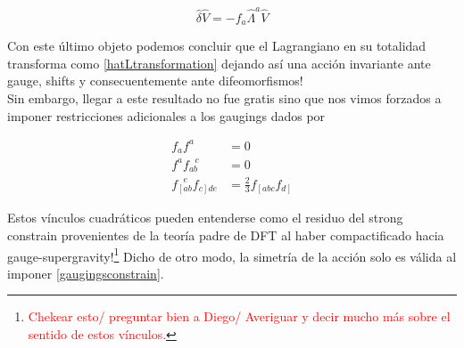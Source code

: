 \documentclass{article}
\numberwithin{equation}{section}
\begin{document}
\begin{equation}
\hat{\delta} \hat{V} = - f_a \hat{\Lambda}^a \hat{V}
\end{equation}

Con este último objeto podemos concluir que el Lagrangiano en su totalidad transforma como \ref{hatLtransformation} dejando así una acción invariante ante gauge, shifts y consecuentemente ante difeomorfismos!\\

Sin embargo, llegar a este resultado no fue gratis sino que nos vimos forzados a imponer restricciones adicionales a los gaugings dados por

\begin{boxeq}
\begin{equation}\label{gaugingsconstrain}
	\begin{aligned}
		f_a f^a &=0\\
		f^a f_{a b}^{\ \ \ c} &=0\\
		f_{\left[a b\right.}^{\ \ \ e} f_{\left. c\right] d e} &= \frac{2}{3} f_{\left[ a b c\right.} f_{\left.d\right]}
	\end{aligned}
\end{equation}
\end{boxeq}

Estos vínculos cuadráticos pueden entenderse como el residuo del strong constrain provenientes de la teoría padre de DFT al haber compactificado hacia gauge-supergravity!\footnote{\textcolor{red}{Chekear esto/ preguntar bien a Diego/ Averiguar y decir mucho más sobre el sentido de estos vínculos.}} Dicho de otro modo, la simetría de la acción solo es válida al imponer \ref{gaugingsconstrain}.
 
\vspace{.8cm}
\end{document}
